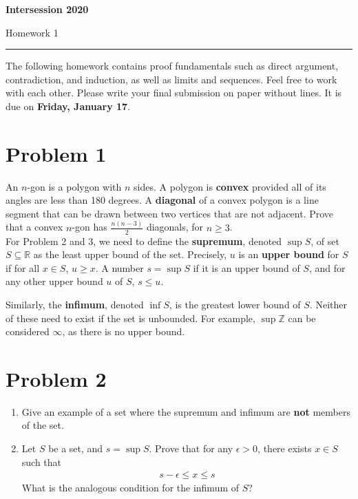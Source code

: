 \documentclass[11pt]{article}
\newcommand{\R}{\ensuremath{\mathbb R}}
\newcommand{\Z}{\ensuremath{\mathbb Z}}
\theoremstyle{plain}
\theoremstyle{definition}
\theoremstyle{remark}
\begin{document}

 \hfill {\bf Intersession 2020}

 \hfill 
{Homework 1}

\noindent \rule[0.1in]{\textwidth}{0.4pt}

The following homework contains proof fundamentals such as direct argument, contradiction, and induction, as well as limits and sequences. Feel free to work with each other. Please write your final submission on paper without lines. It is due on {\bf Friday, January 17}.


\section*{Problem 1}

An $n$-gon is a polygon with $n$ sides. A polygon is {\bf convex} provided all of its angles are less than 180 degrees. A {\bf diagonal} of a convex polygon is a line segment that can be drawn between two vertices that are not adjacent.  Prove that a convex $n$-gon has $\frac{n(n-3)}{2}$ diagonals, for $n \geq 3$.\\

For Problem 2 and 3, we need to define the {\bf supremum}, denoted $\sup S$, of set $S \subseteq \R$ as the least upper bound of the set. Precisely, $u$ is an {\bf upper bound} for $S$ if for all $x \in S$, $u \geq x$. A number $s = \sup S$ if it is an upper bound of $S$, and for any other upper bound $u$ of $S$, $s \leq u$.

Similarly, the {\bf infimum}, denoted $\inf S$, is the greatest lower bound of $S$. Neither of these need to exist if the set is unbounded. For example, $\sup \Z$ can be considered $\infty$, as there is no upper bound.

\section*{Problem 2}

\begin{enumerate}
    \item Give an example of a set where the supremum and infimum are {\bf not} members of the set.
    \item Let $S$ be a set, and $s = \sup S$. Prove that for any $\epsilon > 0$, there exists $x \in S$ such that
    \begin{align*}
        s - \epsilon \leq x \leq s
    \end{align*}
    What is the analogous condition for the infimum of $S$?
\end{enumerate}
\end{document}
